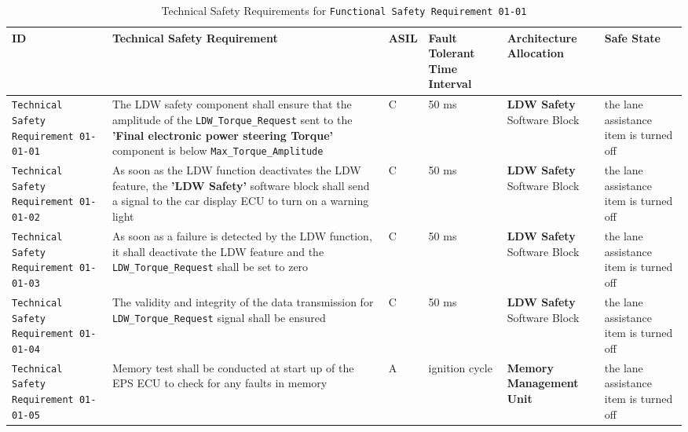 \begin{table}[!htpb]
\caption{Technical Safety Requirements for \textcolor{dark-green}{\texttt{Functional Safety Requirement 01-01}}}
\begin{center}
\scriptsize
\renewcommand{\arraystretch}{1.4}
\begin{tabular}{ L{1.8cm}|L{5.2cm}|L{0.7cm}|L{1.3cm}|L{1.8cm}|L{2.0cm}  }
\hline
{}
ID &
Technical Safety Requirement  &
ASIL &
Fault Tolerant Time Interval  &  
Architecture Allocation  &  
Safe State \\\hline
\textcolor{harmonia-blue}{\texttt{Technical Safety Requirement 01-01-01}}  &
The LDW safety component shall ensure that the amplitude of the 
  \textcolor{dark-red}{\texttt{LDW\_Torque\_Request}}
  sent to the 
  \textbf{'Final electronic power steering Torque'} component is below 
  \textcolor{dark-red}{\texttt{Max\_Torque\_Amplitude}} &
C &
50 ms  &
  \textbf{LDW Safety} Software Block  &
the lane assistance item is turned off 
\\\hline
\textcolor{harmonia-blue}{\texttt{Technical Safety Requirement 01-01-02}}  &
As soon as the LDW function deactivates the LDW feature, the 
  \textbf{'LDW Safety'}
  software block shall send a signal to the car display ECU to turn on a
  warning light&
C &
50 ms  &
  \textbf{LDW Safety} Software Block  &
the lane assistance item is turned off 
\\\hline
\textcolor{harmonia-blue}{\texttt{Technical Safety Requirement 01-01-03}}  &
As soon as a failure is detected by the LDW function, it shall deactivate the
  LDW feature and the 
  \textcolor{dark-red}{\texttt{LDW\_Torque\_Request}} shall be set to zero &
C &
50 ms  &
  \textbf{LDW Safety} Software Block  &
the lane assistance item is turned off 
\\\hline
\textcolor{harmonia-blue}{\texttt{Technical Safety Requirement 01-01-04}}  &
The validity and integrity of the data transmission for 
  \textcolor{dark-red}{\texttt{LDW\_Torque\_Request}}
  signal shall be ensured &
C &
50 ms  &
  \textbf{LDW Safety} Software Block  &
the lane assistance item is turned off 
\\\hline
\textcolor{harmonia-blue}{\texttt{Technical Safety Requirement 01-01-05}}  &
Memory test shall be conducted at start up of the EPS ECU to check for any
  faults in memory &
A &
ignition cycle  &
  \textbf{Memory Management Unit}   &
the lane assistance item is turned off 
\\\hline
\end{tabular}
\end{center}
\label{tab:tr0101}
\end{table}

